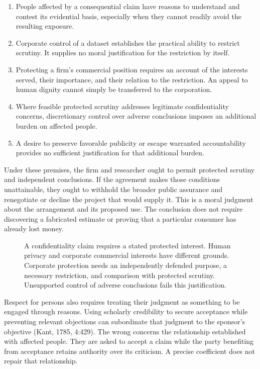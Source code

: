\begin{enumerate}
\def\labelenumi{\arabic{enumi}.}
\tightlist
\item
  People affected by a consequential claim have reasons to understand
  and contest its evidential basis, especially when they cannot readily
  avoid the resulting exposure.
\item
  Corporate control of a dataset establishes the practical ability to
  restrict scrutiny. It supplies no moral justification for the
  restriction by itself.
\item
  Protecting a firm's commercial position requires an account of the
  interests served, their importance, and their relation to the
  restriction. An appeal to human dignity cannot simply be transferred
  to the corporation.
\item
  Where feasible protected scrutiny addresses legitimate confidentiality
  concerns, discretionary control over adverse conclusions imposes an
  additional burden on affected people.
\item
  A desire to preserve favorable publicity or escape warranted
  accountability provides no sufficient justification for that
  additional burden.
\end{enumerate}

Under these premises, the firm and researcher ought to permit protected
scrutiny and independent conclusions. If the agreement makes those
conditions unattainable, they ought to withhold the broader public
assurance and renegotiate or decline the project that would supply it.
This is a moral judgment about the arrangement and its proposed use. The
conclusion does not require discovering a fabricated estimate or proving
that a particular consumer has already lost money.

\begin{figure}[htbp]
\centering

\caption{A confidentiality claim requires a stated protected interest. Human privacy and corporate commercial interests have different grounds. Corporate protection needs an independently defended purpose, a necessary restriction, and comparison with protected scrutiny. Unsupported control of adverse conclusions fails this justification.}\label{fig:M09_corporate_confidentiality}
\end{figure}

Respect for persons also requires treating their judgment as something
to be engaged through reasons. Using scholarly credibility to secure
acceptance while preventing relevant objections can subordinate that
judgment to the sponsor's objective (Kant, 1785, 4:429). The wrong
concerns the relationship established with affected people. They are
asked to accept a claim while the party benefiting from acceptance
retains authority over its criticism. A precise coefficient does not
repair that relationship.


